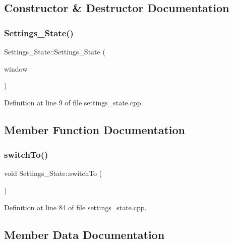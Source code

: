 \subsection{Constructor \& Destructor Documentation}
\hypertarget{class_settings___state_a3b7db311952a3a13613e04a776d90ea5}{}\label{class_settings___state_a3b7db311952a3a13613e04a776d90ea5} 
\subsubsection{\texorpdfstring{Settings\+\_\+\+State()}{Settings\_State()}}
{\footnotesize\ttfamily Settings\+\_\+\+State\+::\+Settings\+\_\+\+State (\begin{DoxyParamCaption}\item[{sf\+::\+Render\+Window \&}]{window }\end{DoxyParamCaption})}



Definition at line 9 of file settings\+\_\+state.\+cpp.



\subsection{Member Function Documentation}
\hypertarget{class_settings___state_a074aa49707b3a4fe530a105f274db1ae}{}\label{class_settings___state_a074aa49707b3a4fe530a105f274db1ae} 
\subsubsection{\texorpdfstring{switch\+To()}{switchTo()}}
{\footnotesize\ttfamily void Settings\+\_\+\+State\+::switch\+To (\begin{DoxyParamCaption}{ }\end{DoxyParamCaption})}



Definition at line 84 of file settings\+\_\+state.\+cpp.



\subsection{Member Data Documentation}
\hypertarget{class_settings___state_ac560b251f0f6211bac46099994fa30eb}{}\label{class_settings___state_ac560b251f0f6211bac46099994fa30eb} 
